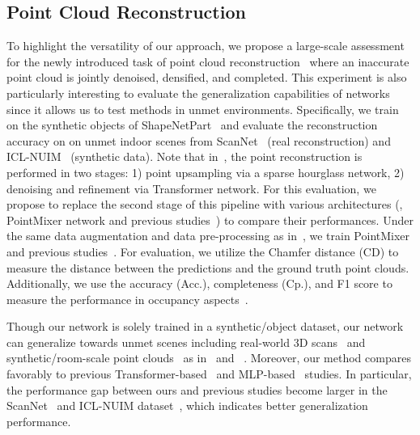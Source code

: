 %
 
\subsection{Point Cloud Reconstruction}
\label{subsec:Point Cloud Reconstruction}
To highlight the versatility of our approach, we propose a large-scale assessment for the newly introduced task of point cloud reconstruction~\cite{point-recon} where an inaccurate point cloud is jointly denoised, densified, and completed. This experiment is also particularly interesting to evaluate the generalization capabilities of networks since it allows us to test methods in unmet environments. 
Specifically, we train on the synthetic objects of ShapeNetPart~\cite{shapenet-part} and evaluate the reconstruction accuracy on on unmet indoor scenes from ScanNet~\cite{scannet} (real reconstruction) and ICL-NUIM~\cite{icl-nuim} (synthetic data).
Note that in~\cite{point-recon}, the point reconstruction is performed in two stages: 1) point upsampling via a sparse hourglass network, 2) denoising and refinement via Transformer network. For this evaluation, we propose to replace the second stage of this pipeline with various architectures (\ie, PointMixer network and previous studies~\cite{pointnet,pointnet++,point-transformer}) to compare their performances. Under the same data augmentation and data pre-processing as in~\cite{point-recon,pcu-dispu}, we train PointMixer and previous studies~\cite{pointnet,pointnet++,point-transformer}. For evaluation, we utilize the Chamfer distance (CD) to measure the distance between the predictions and the ground truth point clouds. Additionally, we use the accuracy (Acc.), completeness (Cp.), and F1 score to measure the performance in occupancy aspects~\cite{dtu_dataset_0,dtu_dataset_1,mvsnet,tanks-and-temples}.

Though our network is solely trained in a synthetic/object dataset, our network can generalize towards unmet scenes including real-world 3D scans~\cite{scannet} and synthetic/room-scale point clouds~\cite{icl-nuim} as in~ and ~. 
Moreover, our method compares favorably to previous Transformer-based~\cite{point-transformer,point-recon} and MLP-based~\cite{pointnet,pointnet++} studies. In particular, the performance gap between ours and previous studies become larger in the ScanNet~\cite{scannet} and ICL-NUIM dataset~\cite{icl-nuim}, which indicates better generalization performance.



